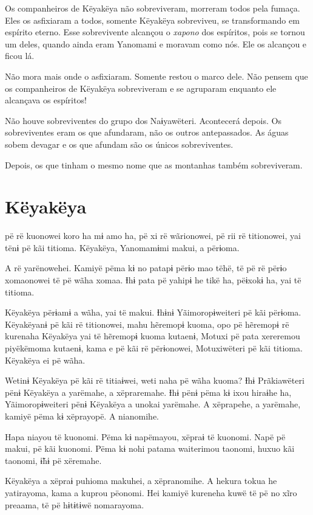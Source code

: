 Os companheiros de Këyakëya não sobreviveram, morreram todos pela
fumaça. Eles os asfixiaram a todos, somente Këyakëya sobreviveu, se
transformando em espírito eterno. Esse sobrevivente alcançou o \textit{xapono} dos
espíritos, pois se tornou um deles, quando ainda eram Yanomami e moravam
como nós. Ele os alcançou e ficou lá. 

Não mora mais onde o asfixiaram. Somente restou o marco dele. Não pensem
que os companheiros de Këyakëya sobreviveram e se agruparam enquanto ele
alcançava os espíritos! 

Não houve sobreviventes do grupo dos Naɨyawëteri. Acontecerá depois. Os
sobreviventes eram os que afundaram, não os outros antepassados. As
águas sobem devagar e os que afundam são os únicos sobreviventes. 

Depois, os que tinham o mesmo nome que as montanhas também
sobreviveram.

\chapter{Këyakëya}

 pë rë kuonowei koro ha mɨ amo ha, pë xi rë wãrionowei, pë rii rë
titionowei, yai tënɨ pë kãi titioma. Këyakëya, Yanomamɨmi makui, a
përɨoma. 

A rë yarënowehei. Kamiyë pëma kɨ no patapɨ përɨo mao tëhë, të pë rë
përɨo xomaonowei të pë wãha xomaa. Ɨhɨ pata pë yahipɨ he tikë ha,
pëɨxokɨ ha, yai të titioma. 

Këyakëya përɨamɨ a wãha, yai të makui. Ɨhɨnɨ Yãimoropɨweiteri pë kãi
përɨoma. Këyakëyanɨ pë kãi rë titionowei, mahu hẽremopɨ kuoma, opo pë
hẽremopɨ rë kurenaha Këyakëya yai të hẽremopɨ kuoma kutaenɨ, Motuxi pë
pata xereremou piyëkëmoma kutaenɨ, kama e pë kãi rë përɨonowei,
Motuxiwëteri pë kãi titioma. Këyakëya ei pë wãha. 

Wetinɨ Këyakëya pë kãi rë titiaɨwei, weti naha pë wãha kuoma? Ɨhɨ
Prãkiawëteri pënɨ Këyakëya a yarëmahe, a xëpraremahe. Ɨhɨ pënɨ pëma kɨ
ixou hiraɨhe ha, Yãimoropɨweiteri pënɨ Këyakëya a unokai yarëmahe. A xëprapehe, a yarëmahe, kamiyë pëma kɨ xëprayopë. A nianomihe. 

Hapa niayou të kuonomi. Pëma kɨ napëmayou, xëpraɨ të kuonomi. Napë pë
makui, pë kãi kuonomi. Pëma kɨ nohi patama waiterimou taonomi, huxuo kãi
taonomi, ɨ̃hɨ pë xëremahe. 

Këyakëya a xëpraɨ puhioma makuhei, a xëpranomihe. A hekura tokua he
yatirayoma, kama a kuprou pëonomi. Hei kamiyë kureneha kuwë të pë no
xĩro preaama, të pë hɨtɨtɨwë nomarayoma. 


